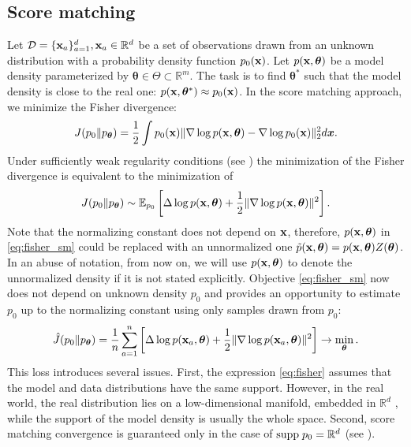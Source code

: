 \subsection{Score matching}
Let ${\cal D} = \{{\bf x}_a\}_{a = 1}^d, {\bf x}_a \in \mathbb{R}^d$ be a set of observations
drawn from an unknown distribution with a probability density function $p_0({\bf x})$.
Let $p({\bf x}, {\bm \theta})$ be a model density parameterized by
${\bm \theta} \in \Theta \subset \mathbb{R}^m$.
The task is to find ${\bm \theta}^*$ such that the model density is close to the real one:
$p({\bf x}, {\bm \theta}^*) \approx p_0({\bf x})$.
In the score matching approach, we minimize the Fisher divergence:
\begin{equation}
    J(p_0 \| p_{\bm{\theta}}) = \frac12 \int p_0({\bf x})\|\nabla \log p({\bf x}, {\bm \theta}) - \nabla \log p_0({\bf x})\|_2^2 d\bm{x}.
    \label{eq:fisher}
\end{equation}
Under sufficiently weak regularity conditions (see \cite{Hyvarinen2005})
the minimization of the Fisher divergence is equivalent to the minimization of
\begin{equation}
    J(p_0 \| p_{\bm{\theta}}) \sim \mathbb{E}_{p_0}\left[\Delta \log p({\bf x}, {\bm \theta}) + \frac{1}{2}\|\nabla \log p({\bf x}, {\bm \theta})\|^2\right]
    \label{eq:fisher_sm}.
\end{equation}
Note that the normalizing constant does not depend on ${\bf x}$,
therefore, $p({\bf x}, {\bm \theta})$ in \eqref{eq:fisher_sm}
could be replaced with an unnormalized one
$\Tilde{p}({\bf x}, {\bm \theta}) = p({\bf x}, {\bm \theta}) Z({\bm \theta})$.
In an abuse of notation, from now on, we will use
$p({\bf x}, {\bm \theta})$ to denote the unnormalized density if it is not stated explicitly.
Objective \eqref{eq:fisher_sm} now does not depend on unknown density $p_0$ and provides an
opportunity to estimate $p_0$ up to the normalizing constant using only samples drawn from $p_0$:
\begin{equation}
    \hat{J}(p_0 \| p_{\bm{\theta}}) = \frac{1}{n}\sum_{a = 1}^n\left[\Delta \log p({\bf x}_a, {\bm \theta}) + \frac{1}{2}\|\nabla \log p({\bf x}_a, {\bm \theta})\|^2\right] \to \min_{{\bm \theta}}.
    \label{eq:fisher_sm_sample}
\end{equation}
This loss introduces several issues.
First, the expression \eqref{eq:fisher} assumes that the model and data distributions
have the same support.
However, in the real world, the real distribution lies on a low-dimensional manifold, embedded
in $\mathbb{R}^d$ \cite{song2019generative},
while the support of the model density is usually the whole space.
Second, score matching convergence is guaranteed only in the case of
${\rm supp\;} p_0 = \mathbb{R}^d$ (see \cite{Hyvarinen2005}).

